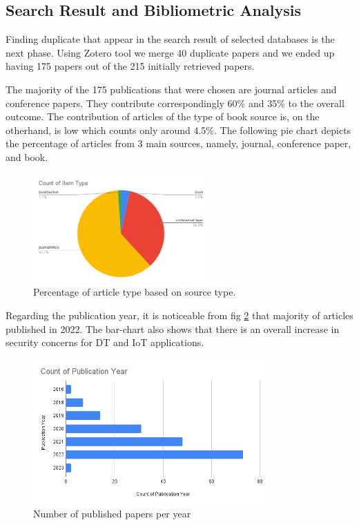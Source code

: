 \subsection{Search Result and Bibliometric Analysis}
Finding duplicate that appear in the search result of selected databases is the next phase. Using Zotero tool we merge 40 duplicate papers and we ended up having 175 papers out of the 215 initially retrieved papers. 

The majority of the 175 publications that were chosen are journal articles and conference papers. They contribute correspondingly 60\% and 35\% to the overall outcome. The contribution of articles of the type of book source is, on the otherhand, is low which counts only around 4.5\%. The following pie chart depicts the percentage of articles from 3 main sources, namely, journal, conference paper, and book.  

\begin{figure}[ht]
    \centering
    \includegraphics[width=0.6\textwidth]{images/itemtype.png}
    \caption{Percentage of article type based on source type. }
    \label{fig:slr scheme}
\end{figure}

Regarding the publication year, it is noticeable from fig \ref{fig:bar-chart-yaer} that majority of articles published in 2022. The bar-chart also shows that there is an overall increase in security concerns for DT and IoT applications.

\begin{figure}[ht]
    \centering
    \includegraphics[width=0.8\textwidth]{images/year.png}
    \caption{Number of published papers per year}
    \label{fig:bar-chart-yaer}
\end{figure}


